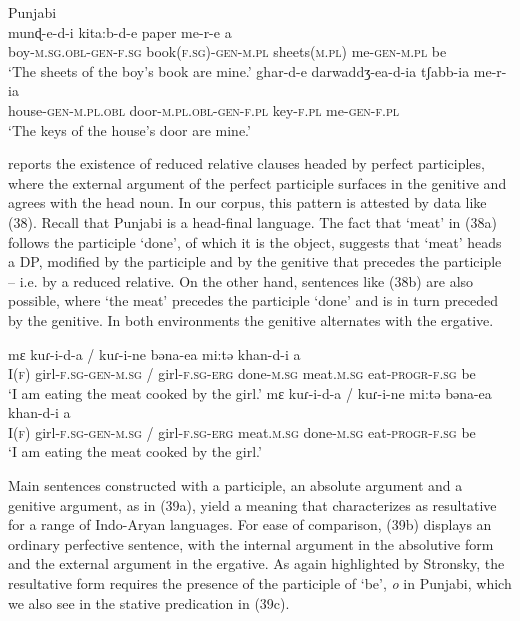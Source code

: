 \documentclass[output=paper]{langsci/langscibook}
\begin{document}
\ea%
    Punjabi\label{ex:manzini:37}\\
    \ea
    \gll munɖ-e-d-i   kita:b-d-e   paper   me-r-e  a \\
         boy-\textsc{m.sg.obl-gen-f.sg}   book\textsc{(f.sg)-gen-m.pl}  sheets\textsc{(m.pl)}  me-\textsc{gen-m.pl}   be \\
    \glt ‘The sheets of the boy’s book are mine.’
    \ex
    \gll ghar-d-e   darwaddʒ-ea-d-ia   tʃabb-ia   me-r-ia\\
         house-\textsc{gen-m.pl.obl}  door-\textsc{m.pl.obl-gen-f.pl}  key-\textsc{f.pl}  me-\textsc{gen-f.pl}    \\
    \glt ‘The keys of the house’s door are mine.’
    \z
\z

\citet[295]{Payne1995} reports the existence of reduced relative clauses headed by perfect participles, where the external argument of the perfect participle surfaces in the genitive and agrees with the head noun. In our corpus, this pattern is attested by data like (38). Recall that Punjabi is a head-final language. The fact that ‘meat’ in (38a) follows the participle ‘done’, of which it is the object, suggests that ‘meat’ heads a DP, modified by the participle and by the genitive that precedes the participle – i.e. by a reduced relative. On the other hand, sentences like (38b) are also possible, where ‘the meat’ precedes the participle ‘done’ and is in turn preceded by the genitive. In both environments the genitive alternates with the ergative.

\ea%
    \label{ex:manzini:38}
    \ea
    \gll mɛ  kuɾ-i-d-a /  kuɾ-i-ne  bəna-ea      mi:tə      khan-d-i   a\\
         I(\textsc{f})  girl-\textsc{f.sg-gen-m.sg} /  girl-\textsc{f.sg-erg}  done-\textsc{m.sg}  meat.\textsc{m.sg}  eat-\textsc{progr-f.sg}  be\\
    \glt ‘I am eating the meat cooked by the girl.’
    \ex
    \gll mɛ  kuɾ-i-d-a /   kuɾ-i-ne   mi:tə  bəna-ea     khan-d-i   a\\
         I(\textsc{f})  girl-\textsc{f.sg-gen-m.sg} /  girl-\textsc{f.sg-erg}   meat.\textsc{m.sg}  done-\textsc{m.sg}   eat-\textsc{progr-f.sg}   be\\
    \glt ‘I am eating the meat cooked by the girl.’
    \z
\z

Main sentences constructed with a participle, an absolute argument and a genitive argument, as in (39a), yield a meaning that \citet{Stroński2013} characterizes as resultative for a range of Indo-Aryan languages. For ease of comparison, (39b) displays an ordinary perfective sentence, with the internal argument in the absolutive form and the external argument in the ergative. As again highlighted by Stronsky, the resultative form requires the presence of the participle of ‘be’, \textit{o} in Punjabi, which we also see in the stative predication in (39c).
\end{document}
